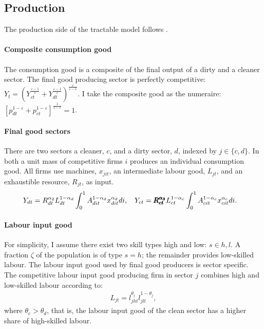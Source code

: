 \subsection{Production}
The production side of the tractable model follows \cite{Acemoglu2012TheChange}. 
\paragraph{Composite consumption good}
The consumption good is a composite of the final output of a dirty and a cleaner sector. The final good producing sector is perfectly competitive:
$Y_t=\left(Y_{ct}^{\frac{\varepsilon-1}{\varepsilon}}+Y_{dt}^{\frac{\varepsilon-1}{\varepsilon}}\right)^\frac{\varepsilon}{\varepsilon-1}$. 
I take the composite good as the numeraire: $\left[p_{dt}^{1-\varepsilon}+p_{ct}^{1-\varepsilon}\right]^{\frac{1}{1-\varepsilon}}=1$.
\paragraph{Final good sectors}
There are two sectors a cleaner, $c$, and a dirty sector, $d$,  indexed by $j\in\{c,d\}$. In both a unit mass of competitive firms $i$ produces an individual consumption good. All firms use machines, $x_{jit}$, an intermediate labour good, $L_{jt}$, and an exhaustible resource, $R_{jt}$, as input. 
\begin{align*}
&Y_{dt}=R_{dt}^{\alpha_2} L_{dt}^{1-\alpha_d}\int_{0}^{1}A_{dit}^{1-\alpha_d}x_{dit}^{\alpha_d} di,\ \hspace{2mm} Y_{ct}=\pmb{R_{ct}^{\alpha_3}} L_{ct}^{1-\alpha_c}\int_{0}^{1}A_{cit}^{1-\alpha_c}x_{cit}^{\alpha_c} di.
\end{align*}

\paragraph{Labour input good}
For simplicity, I assume there exist two skill types high and low: $s \in {h,l}$. %
A fraction $\zeta$ of the population is of type $s=h$; the remainder provides low-skilled labour. 
The labour input good used by final good producers is sector specific. The competitive labour input good producing firm in sector $j$ combines high and low-skilled labour according to:
\begin{align}
L_{jt}=l_{jht}^{\theta_j}l_{jlt}^{1-\theta_j},
\end{align}
where $\theta_c>\theta_d$, that is, the labour input good of the clean sector has a higher share of high-skilled labour.

